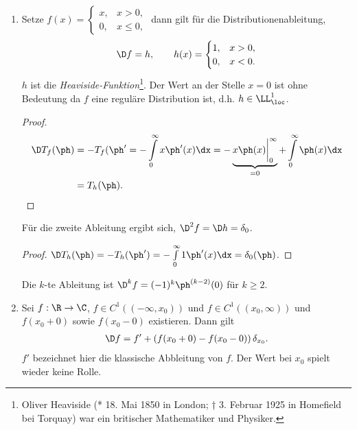 \begin{bsp}
\label{bps:3.15}
\begin{enumerate}[label=\arabic{*}.)]
  \item Setze $f(x) = \begin{cases} x, & x > 0,\\ 0, & x\le 0,\end{cases}$ dann
  gilt für die Distributionenableitung,
  \begin{align*}
  \D f = h,\qquad h(x) = \begin{cases}
                         1, & x> 0,\\
                         0, & x< 0.
                         \end{cases}
  \end{align*}
$h$ ist die \emph{Heaviside-Funktion}\footnote{Oliver Heaviside (* 18. Mai 1850
in London; † 3. Februar 1925 in Homefield bei Torquay) war ein britischer
Mathematiker und Physiker.}. Der Wert an der Stelle $x=0$ ist ohne Bedeutung
da $f$ eine reguläre Distribution ist, d.h. $h\in\LL_\loc^1$.
\begin{proof}
\begin{align*}
\D T_f(\ph) &= -T_f(\ph' = -\int\limits_0^\infty x\ph'(x)\dx = 
-\underbrace{x\ph(x)\bigg|_{0}^\infty}_{=0} + \int\limits_{0}^\infty \ph(x)\dx\\
&= T_h(\ph).\qedhere
\end{align*}
\end{proof}
Für die zweite Ableitung ergibt sich, $\D^2 f = \D h = \delta_0$.
\begin{proof}
$\D T_h(\ph) = -T_h(\ph') = -\int\limits_0^\infty 1 \ph'(x)\dx =
\delta_0(\ph)$.\qedhere
\end{proof}
Die $k$-te Ableitung ist $\D^k f = (-1)^k\ph^{(k-2)}(0)$ für $k\ge2$.
\item Sei $f: \R\to\C$, $f\in C^1((-\infty,x_0))$ und $f\in C^1((x_0,\infty))$
und $f(x_0+0)$ sowie $f(x_0-0)$ existieren. Dann gilt
\begin{align*}
\D f = f' + \left(f(x_0 +0) - f(x_0-0)\right)\delta_{x_0}.
\end{align*}
$f'$ bezeichnet hier die klassische Abbleitung von $f$. Der Wert bei $x_0$
spielt wieder keine Rolle.


\end{enumerate}
\end{bsp}
